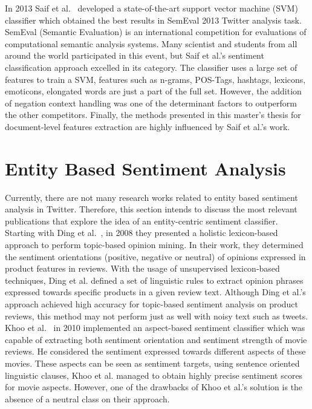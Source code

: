 In 2013 Saif et al.~\cite{MohammadKZ2013} developed a state-of-the-art support vector machine (SVM) classifier which obtained the best results in SemEval 2013 Twitter analysis task. SemEval (Semantic Evaluation) is an international competition for evaluations of computational semantic analysis systems. Many scientist and students from all around the world participated in this event, but Saif et al.'s sentiment classification approach excelled in its category. The classifier uses a large set of features to train a SVM, features such as n-grams, POS-Tags, hashtags, lexicons, emoticons, elongated words are just a part of the full set. However, the addition of negation context handling was one of the determinant factors to outperform the other competitors. Finally, the methods presented in this master's thesis for document-level features extraction are highly influenced by Saif et al.'s work.

\section{Entity Based Sentiment Analysis}

Currently, there are not many research works related to entity based sentiment analysis in Twitter. Therefore, this section intends to discuss the most relevant publications that explore the idea of an entity-centric sentiment classifier. Starting with Ding et al.~\cite{ding2008holistic}, in 2008 they presented a holistic lexicon-based approach to perform topic-based opinion mining. In their work, they determined the sentiment orientations (positive, negative or neutral) of opinions expressed in product features in reviews. With the usage of unsupervised lexicon-based techniques, Ding et al. defined a set of linguistic rules to extract opinion phrases expressed towards specific products in a given review text. Although Ding et al.'s approach achieved high accuracy for topic-based sentiment analysis on product reviews, this method may not perform just as well with noisy text such as tweets. Khoo et al.~\cite{thet2010aspect} in 2010 implemented an aspect-based sentiment classifier which was capable of extracting both sentiment orientation and sentiment strength of movie reviews. He considered the sentiment expressed towards different aspects of these movies. These aspects can be seen as sentiment targets, using sentence oriented linguistic clauses, Khoo et al. managed to obtain highly precise sentiment scores for movie aspects. However, one of the drawbacks of Khoo et al.'s solution is the absence of a neutral class on their approach. 



